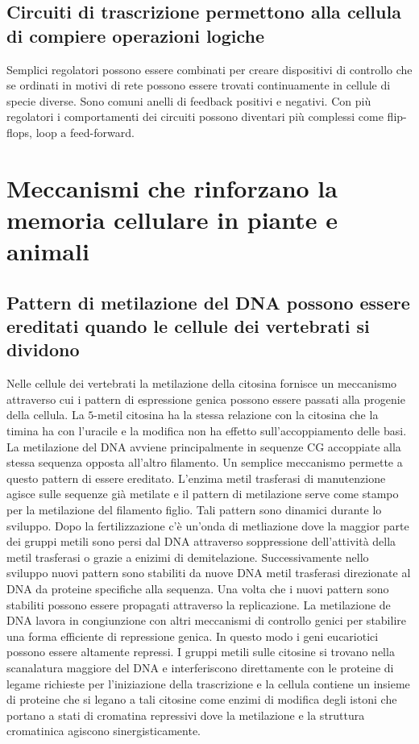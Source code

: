 \subsection{Circuiti di trascrizione permettono alla cellula di compiere operazioni logiche}
Semplici regolatori possono essere combinati per creare dispositivi di controllo che se ordinati in motivi di rete possono essere trovati continuamente in cellule di specie diverse. 
Sono comuni anelli di feedback positivi e negativi. Con pi\`u regolatori i comportamenti dei circuiti possono diventari pi\`u complessi come flip-flops, loop a feed-forward. 
\section{Meccanismi che rinforzano la memoria cellulare in piante e animali}
\subsection{Pattern di metilazione del DNA possono essere ereditati quando le cellule dei vertebrati si dividono}
Nelle cellule dei vertebrati la metilazione della citosina fornisce un meccanismo attraverso cui i pattern di espressione genica possono essere passati alla progenie della cellula. La
$5$-metil citosina ha la stessa relazione con la citosina che la timina ha con l'uracile e la modifica non ha effetto sull'accoppiamento delle basi. La metilazione del DNA avviene 
principalmente in sequenze CG accoppiate alla stessa sequenza opposta all'altro filamento. Un semplice meccanismo permette a questo pattern di essere ereditato. L'enzima metil trasferasi
di manutenzione agisce sulle sequenze gi\`a metilate e il pattern di metilazione serve come stampo per la metilazione del filamento figlio. Tali pattern sono dinamici durante lo 
sviluppo. Dopo la fertilizzazione c'\`e un'onda di metliazione dove la maggior parte dei gruppi metili sono persi dal DNA attraverso soppressione dell'attivit\`a della metil trasferasi o
grazie a enizimi di demitelazione. Successivamente nello sviluppo nuovi pattern sono stabiliti da nuove DNA metil trasferasi direzionate al DNA da proteine specifiche alla sequenza.
Una volta che i nuovi pattern sono stabiliti possono essere propagati attraverso la replicazione. La metilazione de DNA lavora in congiunzione con altri meccanismi di controllo genici
per stabilire una forma efficiente di repressione genica. In questo modo i geni eucariotici possono essere altamente repressi. I gruppi metili sulle citosine si trovano nella scanalatura
maggiore del DNA e interferiscono direttamente con le proteine di legame richieste per l'iniziazione della trascrizione e la cellula contiene un insieme di proteine che si legano a tali
citosine come enzimi di modifica degli istoni che portano a stati di cromatina repressivi dove la metilazione e la struttura cromatinica agiscono sinergisticamente.
